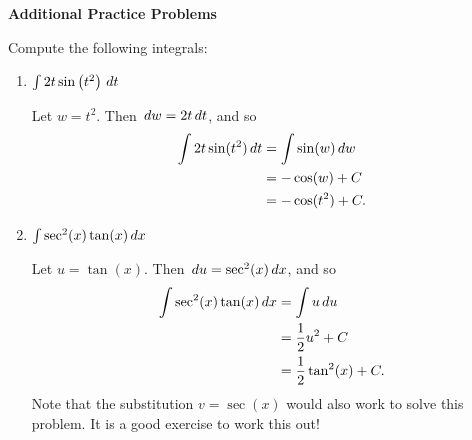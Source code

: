 \documentclass[nooutcomes]{ximera}
\begin{document}
{\bf  Additional Practice Problems}







\begin{problem}
Compute the following integrals:

	\begin{enumerate}
	
	\item  $\int 2t \sin \left( t^2 \right) \,d t$
		\begin{freeResponse}
		Let $w=t^2$.  Then $\,d w = 2t \,d t$, and so
			\begin{align*}
			\int 2t \sin(t^2) \,d t &= \int \sin(w) \,d w  \\
			&= - \cos(w) + C  \\
			&= - \cos(t^2) + C.
			\end{align*}
		\end{freeResponse}
		
		
		
	\item  $\int \sec^2(x) \tan(x) \,d x$
		\begin{freeResponse}
		Let $u = \tan(x)$.  Then $\,d u = \sec^2 (x) \,d x$, and so
			\begin{align*}
			\int \sec^2(x) \tan(x) \,d x &= \int u \,d u  \\
			&= \frac{1}{2} u^2 + C  \\
			&= \frac{1}{2} \tan^2(x) + C.
			\end{align*}
		Note that the substitution $v=\sec(x)$ would also work to solve this problem.  
		It is a good exercise to work this out!
		\end{freeResponse}
		
		
		
	\end{enumerate}
		
		
\end{problem}
\end{document}
